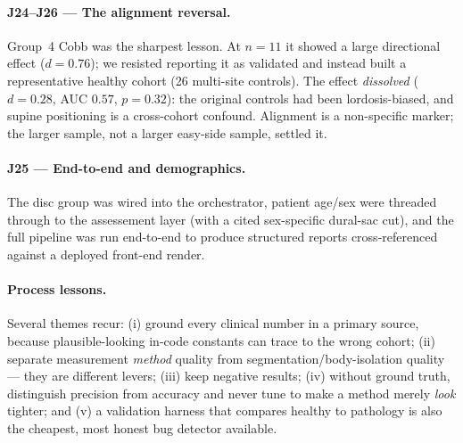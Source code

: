 \paragraph{J24--J26 --- The alignment reversal.} Group~4 Cobb was the sharpest lesson. At $n{=}11$ it
showed a large directional effect ($d{=}0.76$); we resisted reporting it as validated and instead built a
representative healthy cohort (26 multi-site controls). The effect \emph{dissolved} ($d{=}0.28$, AUC
$0.57$, $p{=}0.32$): the original controls had been lordosis-biased, and supine positioning is a
cross-cohort confound. Alignment is a non-specific marker; the larger sample, not a larger easy-side
sample, settled it.

\paragraph{J25 --- End-to-end and demographics.} The disc group was wired into the orchestrator, patient
age/sex were threaded through to the assessement layer (with a cited sex-specific dural-sac cut), and
the full pipeline was run end-to-end to produce structured reports cross-referenced against a deployed
front-end render.

\paragraph{Process lessons.} Several themes recur: (i) ground every clinical number in a primary source,
because plausible-looking in-code constants can trace to the wrong cohort; (ii) separate measurement
\emph{method} quality from segmentation/body-isolation quality --- they are different levers; (iii) keep
negative results; (iv) without ground truth, distinguish precision from accuracy and never tune to make a
method merely \emph{look} tighter; and (v) a validation harness that compares healthy to pathology is also
the cheapest, most honest bug detector available.
